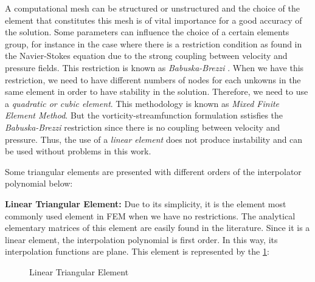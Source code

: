 A computational mesh can be structured or unstructured and 
the choice of the element that constitutes this mesh is of 
vital importance for a good accuracy of the solution. 
Some parameters can influence the choice of a certain elements group, 
for instance in the case where there is a restriction condition 
as found in the Navier-Stokes equation due to the strong coupling 
between velocity and pressure fields. 
This restriction is known as \textit{Babuska-Brezzi} 
\cite{babuska1971} \cite{brezzi1974}. 
When we have this restriction, 
we need to have different numbers of nodes for each unkowns 
in the same element in order to have stability in the solution.
Therefore, we need to use a \textit{quadratic or cubic element}. 
This methodology is known as \textit{Mixed Finite Element Method}. 
But the vorticity-streamfunction formulation sstisfies 
the \textit{Babuska-Brezzi} restriction since there is no coupling 
between velocity and pressure. 
Thus, the use of a \textit{linear element} does not produce 
instability and can be used without problems in this work.

\medskip
Some triangular elements are presented with different orders of the interpolator polynomial below:

\medskip
\noindent
\textbf{Linear Triangular Element:} 
Due to its simplicity, 
it is the element most commonly used element in FEM when 
we have no restrictions. The analytical elementary matrices 
of this element are easily found in the literature. 
Since it is a linear element, the interpolation
polynomial is first order. 
In this way, its interpolation functions are plane. 
This element is represented by the \ref{elemento triangular linear}:


\begin{figure}[H]
\begin{center}
\end{center}
\caption{Linear Triangular Element}
\label{elemento triangular linear}
\end{figure}

